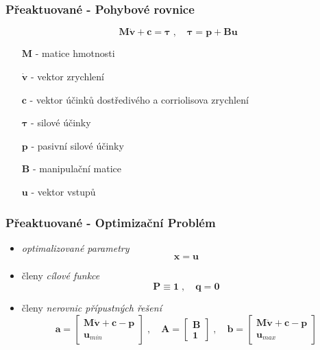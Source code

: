 \begin{frame}
	\frametitle{Přeaktuované - Pohybové rovnice}
	
	\begin{equation*}
		\bm{M} \bm{\dot{v}} + \bm{c} = \bm{\tau}
		\;,\quad \bm{\tau} = \bm{p} + \bm{B}\bm{u}
	\end{equation*}
	\begin{itemize}
		\item [$\bm{M}$] - matice hmotnosti
		\item [$\bm{\dot{v}}$] - vektor zrychlení
		\item [$\bm{c}$] - vektor účinků dostředivého a corriolisova zrychlení
		\item [$\bm{\tau}$] - silové účinky
		\item [$\bm{p}$] - pasivní silové účinky
		\item [$\bm{B}$] - manipulační matice
		\item [$\bm{u}$] - vektor vstupů
	\end{itemize}
\end{frame}

\begin{frame}
	\frametitle{Přeaktuované - Optimizační Problém}
	
	\begin{itemize}
	\item \emph{optimalizované parametry}
	\begin{equation*}
		\bm{x} = \bm{u}
	\end{equation*}
	\item členy \emph{cílové funkce}
	\begin{equation*}
		\bm{P} \equiv \bm{1} \;,\quad \bm{q} = \bm{0}
	\end{equation*}
	\item členy \emph{nerovnic přípustných řešení}
	\begin{equation*}
		\bm{a}
		=
		\begin{bmatrix}
			\bm{M} \bm{\dot{v}} + \bm{c} - \bm{p} \\
			\bm{u}_{min}	
		\end{bmatrix}
		\;,\quad 
		\bm{A}
		=
		\begin{bmatrix}
			\bm{B} \\
			\bm{1}
		\end{bmatrix}
		\;,\quad
		\bm{b}
		=
		\begin{bmatrix}
			\bm{M} \bm{\dot{v}} + \bm{c} - \bm{p} \\
			\bm{u}_{max}	
		\end{bmatrix}
	\end{equation*}
	\end{itemize}
\end{frame}